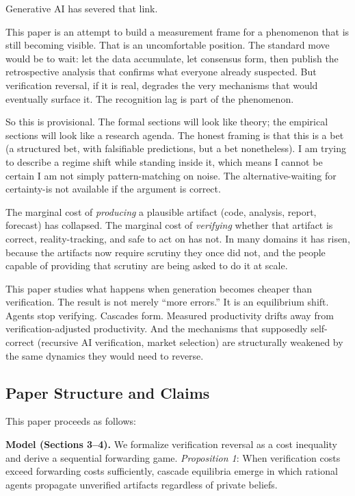 \documentclass[11pt,a4paper]{article}
\begin{document}
Generative AI has severed that link.

This paper is an attempt to build a measurement frame for a phenomenon that is still becoming visible. That is an uncomfortable position. The standard move would be to wait: let the data accumulate, let consensus form, then publish the retrospective analysis that confirms what everyone already suspected. But verification reversal, if it is real, degrades the very mechanisms that would eventually surface it. The recognition lag is part of the phenomenon.

So this is provisional. The formal sections will look like theory; the empirical sections will look like a research agenda. The honest framing is that this is a bet (a structured bet, with falsifiable predictions, but a bet nonetheless). I am trying to describe a regime shift while standing inside it, which means I cannot be certain I am not simply pattern-matching on noise. The alternative-waiting for certainty-is not available if the argument is correct.

The marginal cost of \emph{producing} a plausible artifact (code, analysis, report, forecast) has collapsed. The marginal cost of \emph{verifying} whether that artifact is correct, reality-tracking, and safe to act on has not. In many domains it has risen, because the artifacts now require scrutiny they once did not, and the people capable of providing that scrutiny are being asked to do it at scale.

This paper studies what happens when generation becomes cheaper than verification. The result is not merely ``more errors.'' It is an equilibrium shift. Agents stop verifying. Cascades form. Measured productivity drifts away from verification-adjusted productivity. And the mechanisms that supposedly self-correct (recursive AI verification, market selection) are structurally weakened by the same dynamics they would need to reverse.

\hypertarget{paper-structure-and-claims}{%
\subsection{ Paper Structure and Claims}\label{paper-structure-and-claims}}

This paper proceeds as follows:

\textbf{Model (Sections 3--4).} We formalize verification reversal as a cost inequality and derive a sequential forwarding game. \emph{Proposition 1}: When verification costs exceed forwarding costs sufficiently, cascade equilibria emerge in which rational agents propagate unverified artifacts regardless of private beliefs.
\end{document}
